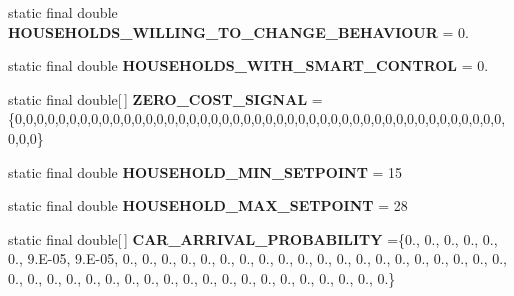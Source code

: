 \begin{DoxyCompactItemize}
\item 
\hypertarget{classuk_1_1ac_1_1dmu_1_1iesd_1_1cascade_1_1base_1_1_consts_a36157159385cd804c8da3d5783f93ea5}{static final double {\bfseries H\-O\-U\-S\-E\-H\-O\-L\-D\-S\-\_\-\-W\-I\-L\-L\-I\-N\-G\-\_\-\-T\-O\-\_\-\-C\-H\-A\-N\-G\-E\-\_\-\-B\-E\-H\-A\-V\-I\-O\-U\-R} = 0.}\label{classuk_1_1ac_1_1dmu_1_1iesd_1_1cascade_1_1base_1_1_consts_a36157159385cd804c8da3d5783f93ea5}

\item 
\hypertarget{classuk_1_1ac_1_1dmu_1_1iesd_1_1cascade_1_1base_1_1_consts_a8bb19be024a909afef1f2585067e075a}{static final double {\bfseries H\-O\-U\-S\-E\-H\-O\-L\-D\-S\-\_\-\-W\-I\-T\-H\-\_\-\-S\-M\-A\-R\-T\-\_\-\-C\-O\-N\-T\-R\-O\-L} = 0.}\label{classuk_1_1ac_1_1dmu_1_1iesd_1_1cascade_1_1base_1_1_consts_a8bb19be024a909afef1f2585067e075a}

\item 
\hypertarget{classuk_1_1ac_1_1dmu_1_1iesd_1_1cascade_1_1base_1_1_consts_ac0b6e816afac90947c76ed59e87cd823}{static final double\mbox{[}$\,$\mbox{]} {\bfseries Z\-E\-R\-O\-\_\-\-C\-O\-S\-T\-\_\-\-S\-I\-G\-N\-A\-L} = \{0,0,0,0,0,0,0,0,0,0,0,0,0,0,0,0,0,0,0,0,0,0,0,0,0,0,0,0,0,0,0,0,0,0,0,0,0,0,0,0,0,0,0,0,0,0,0,0\}}\label{classuk_1_1ac_1_1dmu_1_1iesd_1_1cascade_1_1base_1_1_consts_ac0b6e816afac90947c76ed59e87cd823}

\item 
\hypertarget{classuk_1_1ac_1_1dmu_1_1iesd_1_1cascade_1_1base_1_1_consts_a9fb6304fade02a2c0578ce78e9f46a0b}{static final double {\bfseries H\-O\-U\-S\-E\-H\-O\-L\-D\-\_\-\-M\-I\-N\-\_\-\-S\-E\-T\-P\-O\-I\-N\-T} = 15}\label{classuk_1_1ac_1_1dmu_1_1iesd_1_1cascade_1_1base_1_1_consts_a9fb6304fade02a2c0578ce78e9f46a0b}

\item 
\hypertarget{classuk_1_1ac_1_1dmu_1_1iesd_1_1cascade_1_1base_1_1_consts_aa7112052e29d9982cf507f9df29d9950}{static final double {\bfseries H\-O\-U\-S\-E\-H\-O\-L\-D\-\_\-\-M\-A\-X\-\_\-\-S\-E\-T\-P\-O\-I\-N\-T} = 28}\label{classuk_1_1ac_1_1dmu_1_1iesd_1_1cascade_1_1base_1_1_consts_aa7112052e29d9982cf507f9df29d9950}

\item 
\hypertarget{classuk_1_1ac_1_1dmu_1_1iesd_1_1cascade_1_1base_1_1_consts_a29d1db47b05bc858a64a06bb71bcc5db}{static final double\mbox{[}$\,$\mbox{]} {\bfseries C\-A\-R\-\_\-\-A\-R\-R\-I\-V\-A\-L\-\_\-\-P\-R\-O\-B\-A\-B\-I\-L\-I\-T\-Y} =\{0., 0., 0., 0., 0., 0., 9.\-E-\/05, 9.\-E-\/05, 0., 0., 0., 0., 0., 0., 0., 0., 0., 0., 0., 0., 0., 0., 0., 0., 0., 0., 0., 0., 0., 0., 0., 0., 0., 0., 0., 0., 0., 0., 0., 0., 0., 0., 0., 0., 0., 0., 0., 0.\}}\label{classuk_1_1ac_1_1dmu_1_1iesd_1_1cascade_1_1base_1_1_consts_a29d1db47b05bc858a64a06bb71bcc5db}


\end{DoxyCompactItemize}
